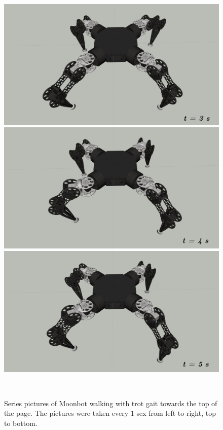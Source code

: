 \begin{figure}[t]
\begin{minipage}[b]{0.32\textwidth}
  \end{minipage}\\
  \begin{minipage}[b]{0.32\textwidth}
    \centering
    \includegraphics[clip, width=\textwidth]{./fig/chap4/gait/trot/t_step4.png}
  \end{minipage}
  \begin{minipage}[b]{0.32\textwidth}
    \centering
    \includegraphics[clip, width=\textwidth]{./fig/chap4/gait/trot/t_step5.png}
  \end{minipage}
  \begin{minipage}[b]{0.32\textwidth}
    \centering
    \includegraphics[clip, width=\textwidth]{./fig/chap4/gait/trot/t_step6.png}
  \end{minipage}\\
\caption{Series pictures of Moonbot walking with trot gait towards the top of the page. The pictures were taken every 1 sex from left to right, top to bottom.}
\label{trotsnap}
\end{figure}

